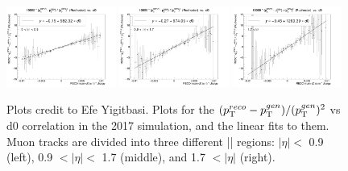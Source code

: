 \begin{figure}[!htb]
      \centering
      \captionsetup{justification=justified}
      \includegraphics[width=0.32\textwidth]{pics/muon_corr/GeoFit/fit_results/2017_DY_eta_0_0p9_dRelPt2p0_Roch.png}
      \includegraphics[width=0.32\textwidth]{pics/muon_corr/GeoFit/fit_results/2017_DY_eta_0p9_1p7_dRelPt2p0_Roch.png}
      \includegraphics[width=0.32\textwidth]{pics/muon_corr/GeoFit/fit_results/2017_DY_eta_1p7_inf_dRelPt2p0_Roch.png}
      \caption{Plots credit to Efe Yigitbasi.
               Plots for the $(p_{\mathrm{T}}^{reco}-p_{\mathrm{T}}^{gen})/ (p_{\mathrm{T}}^{gen})^{2}$ vs d0 correlation in the 2017 \DY simulation, 
               and the linear fits to them. Muon tracks are divided into three different |\eta| regions:
               $|\eta| <$ 0.9 (left), 0.9 $< |\eta| <$ 1.7 (middle), and 1.7 $< |\eta|$ (right).
               }
      \label{fig:geofit_param_2017}
\end{figure}

